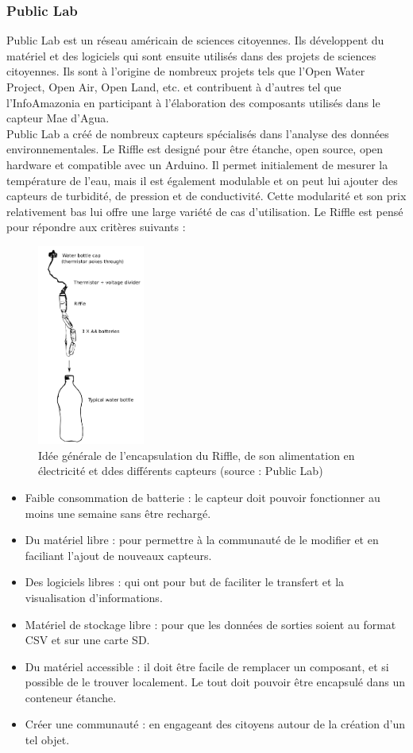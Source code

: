 \documentclass[10pt, article]{llncs}
\begin{document}
		\subsubsection{Public Lab}
		Public Lab est un réseau américain de sciences citoyennes. Ils développent du matériel et des logiciels qui sont ensuite utilisés dans des projets de sciences citoyennes. Ils sont à l'origine de nombreux projets tels que l'Open Water Project, Open Air, Open Land, etc. et contribuent à d'autres tel que l'InfoAmazonia en participant à l'élaboration des composants utilisés dans le capteur Mae d'Agua.\\
			Public Lab a créé de nombreux capteurs spécialisés dans l'analyse des données environnementales. Le Riffle est designé pour être étanche, open source, open hardware et compatible avec un Arduino. Il permet initialement de mesurer la température de l'eau, mais il est également modulable et on peut lui ajouter des capteurs de turbidité, de pression et de conductivité. Cette modularité et son prix relativement bas lui offre une large variété de cas d'utilisation. Le Riffle est pensé pour répondre aux critères suivants :
			\begin{figure}
				\begin{center}
					\includegraphics[width=100pt]{img/bottle_enclosure.png}
				\end{center}
				\caption{Idée générale de l'encapsulation du Riffle, de son alimentation en électricité et ddes différents capteurs (source : Public Lab)}
			\end{figure}
			\begin{itemize}
				\item Faible consommation de batterie : le capteur doit pouvoir fonctionner au moins une semaine sans être rechargé.
				\item Du matériel libre : pour permettre à la communauté de le modifier et en faciliant l'ajout de nouveaux capteurs.
				\item Des logiciels libres : qui ont pour but de faciliter le transfert et la visualisation d'informations.
				\item Matériel de stockage libre : pour que les données de sorties soient au format CSV et sur une carte SD.
				\item Du matériel accessible : il doit être facile de remplacer un composant, et si possible de le trouver localement. Le tout doit pouvoir être encapsulé dans un conteneur étanche.
				\item Créer une communauté : en engageant des citoyens autour de la création d'un tel objet.
			\end{itemize}
\end{document}
